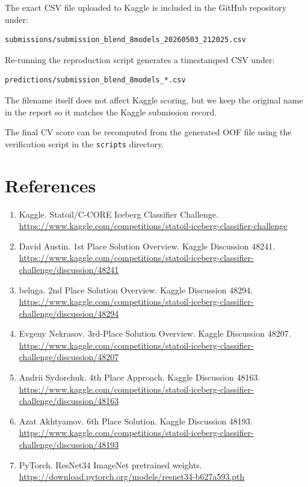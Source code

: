 \documentclass[11pt]{article}
\begin{document}
The exact CSV file uploaded to Kaggle is included in the GitHub repository under:

\begin{lstlisting}
submissions/submission_blend_8models_20260503_212025.csv
\end{lstlisting}

Re-running the reproduction script generates a timestamped CSV under:

\begin{lstlisting}
predictions/submission_blend_8models_*.csv
\end{lstlisting}

The filename itself does not affect Kaggle scoring, but we keep the original name in the report so it matches the Kaggle submission record.

The final CV score can be recomputed from the generated OOF file using the verification script in the \texttt{scripts} directory.

\section*{References}

\begin{enumerate}
  \item Kaggle. Statoil/C-CORE Iceberg Classifier Challenge. \url{https://www.kaggle.com/competitions/statoil-iceberg-classifier-challenge}
  \item David Austin. 1st Place Solution Overview. Kaggle Discussion 48241. \url{https://www.kaggle.com/competitions/statoil-iceberg-classifier-challenge/discussion/48241}
  \item beluga. 2nd Place Solution Overview. Kaggle Discussion 48294. \url{https://www.kaggle.com/competitions/statoil-iceberg-classifier-challenge/discussion/48294}
  \item Evgeny Nekrasov. 3rd-Place Solution Overview. Kaggle Discussion 48207. \url{https://www.kaggle.com/competitions/statoil-iceberg-classifier-challenge/discussion/48207}
  \item Andrii Sydorchuk. 4th Place Approach. Kaggle Discussion 48163. \url{https://www.kaggle.com/competitions/statoil-iceberg-classifier-challenge/discussion/48163}
  \item Azat Akhtyamov. 6th Place Solution. Kaggle Discussion 48193. \url{https://www.kaggle.com/competitions/statoil-iceberg-classifier-challenge/discussion/48193}
  \item PyTorch. ResNet34 ImageNet pretrained weights. \url{https://download.pytorch.org/models/resnet34-b627a593.pth}
\end{enumerate}
\end{document}
